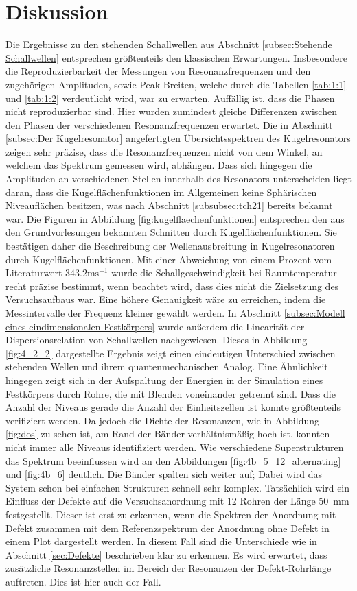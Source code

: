 \section{Diskussion}
\label{sec:Diskussion}
Die Ergebnisse zu den stehenden Schallwellen aus Abschnitt \ref{subsec:Stehende Schallwellen} entsprechen größtenteils den klassischen Erwartungen. 
Insbesondere die Reproduzierbarkeit der Messungen von Resonanzfrequenzen und den zugehörigen Amplituden, sowie Peak Breiten, welche durch die Tabellen \ref{tab:1:1} und \ref{tab:1:2} verdeutlicht wird, war zu erwarten.
Auffällig ist, dass die Phasen nicht reproduzierbar sind. 
Hier wurden zumindest gleiche Differenzen zwischen den Phasen der verschiedenen Resonanzfrequenzen erwartet.
Die in Abschnitt \ref{subsec:Der Kugelresonator} angefertigten Übersichtsspektren des Kugelresonators zeigen sehr präzise, dass die Resonanzfrequenzen nicht von dem Winkel, an welchem das Spektrum gemessen wird, abhängen.
Dass sich hingegen die Amplituden an verschiedenen Stellen innerhalb des Resonators unterscheiden liegt daran, dass die Kugelflächenfunktionen im Allgemeinen keine Sphärischen Niveauflächen besitzen, was nach Abschnitt \ref{subsubsec:tch21} bereits bekannt war.
Die Figuren in Abbildung \ref{fig:kugelflaechenfunktionen} entsprechen den aus den Grundvorlesungen bekannten Schnitten durch Kugelflächenfunktionen.
Sie bestätigen daher die Beschreibung der Wellenausbreitung in Kugelresonatoren durch Kugelflächenfunktionen.
Mit einer Abweichung von einem Prozent vom Literaturwert $343.2\text{ms}^{-1}$ \cite{giancoli} wurde die Schallgeschwindigkeit bei Raumtemperatur recht präzise bestimmt, wenn beachtet wird, dass dies nicht die Zielsetzung des Versuchsaufbaus war. 
Eine höhere Genauigkeit wäre zu erreichen, indem die Messintervalle der Frequenz kleiner gewählt werden. 
In Abschnitt \ref{subsec:Modell eines eindimensionalen Festkörpers} wurde außerdem die Linearität der Dispersionsrelation von Schallwellen nachgewiesen.
Dieses in Abbildung \ref{fig:4_2_2} dargestellte Ergebnis zeigt einen eindeutigen Unterschied zwischen stehenden Wellen und ihrem quantenmechanischen Analog.
Eine Ähnlichkeit hingegen zeigt sich in der Aufspaltung der Energien in der Simulation eines Festkörpers durch Rohre, die mit Blenden voneinander getrennt sind.
Dass die Anzahl der Niveaus gerade die Anzahl der Einheitszellen ist konnte größtenteils verifiziert werden. 
Da jedoch die Dichte der Resonanzen, wie in Abbildung \ref{fig:dos} zu sehen ist, am Rand der Bänder verhältnismäßig hoch ist, konnten nicht immer alle Niveaus identifiziert werden.
Wie verschiedene Superstrukturen das Spektrum beeinflussen wird an den Abbildungen \ref{fig:4b_5_12_alternating} und \ref{fig:4b_6} deutlich. 
Die Bänder spalten sich weiter auf; Dabei wird das System schon bei einfachen Strukturen schnell sehr komplex.
Tatsächlich wird ein Einfluss der Defekte auf die Versuchsanordnung mit 12 Rohren der Länge 50~mm festgestellt.
Dieser ist erst zu erkennen, wenn die Spektren der Anordnung mit Defekt zusammen mit dem Referenzspektrum der Anordnung ohne Defekt in einem Plot dargestellt werden.
In diesem Fall sind die Unterschiede wie in Abschnitt \ref{sec:Defekte} beschrieben klar zu erkennen.
Es wird erwartet, dass zusätzliche Resonanzstellen im Bereich der Resonanzen der Defekt-Rohrlänge auftreten. 
Dies ist hier auch der Fall.
